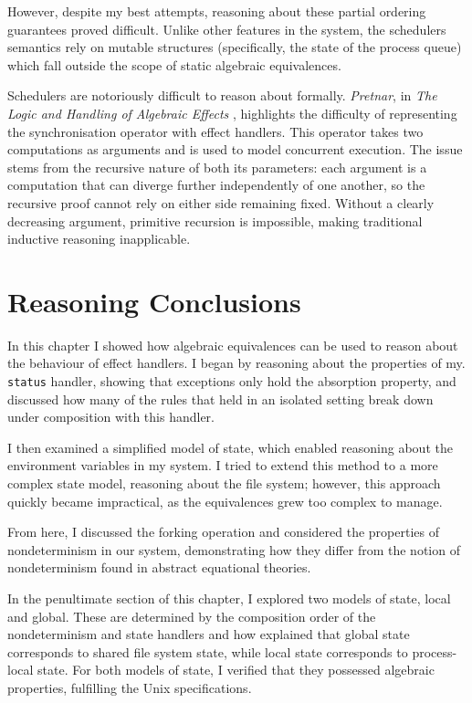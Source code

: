 \documentclass[logo,bsc,singlespacing,parskip]{infthesis}
\begin{document}
However, despite my best attempts, reasoning about these partial ordering guarantees proved difficult. Unlike other features in the system, the schedulers semantics rely on mutable structures (specifically, the state of the process queue) which fall outside the scope of static algebraic equivalences.

Schedulers are notoriously difficult to reason about formally. \textit{Pretnar}, in \textit{The Logic and Handling of Algebraic Effects} \cite{Pretnar:2010}, highlights the difficulty of representing the synchronisation operator with effect handlers. This operator takes two computations as arguments and is used to model concurrent execution. The issue stems from the recursive nature of both its parameters: each argument is a computation that can diverge further independently of one another, so the recursive proof cannot rely on either side remaining fixed. Without a clearly decreasing argument, primitive recursion is impossible, making traditional inductive reasoning inapplicable.

\section{Reasoning Conclusions}
\label{reasoning-conclusion}
In this chapter I showed how algebraic equivalences can be used to reason about the behaviour of effect handlers. I began by reasoning about the properties of my. \lstinline{status} handler, showing that exceptions only hold the absorption property, and discussed how many of the rules that held in an isolated setting break down under composition with this handler. 

I then examined a simplified model of state, which enabled reasoning about the environment variables in my system. I tried to extend this method to a more complex state model, reasoning about the file system; however, this approach quickly became impractical, as the equivalences grew too complex to manage.


From here, I discussed the forking operation and considered the properties of nondeterminism in our system, demonstrating how they differ from the notion of nondeterminism found in abstract equational theories.

In the penultimate section of this chapter, I explored two models of state, local and global. These are determined by the composition order of the {nondeterminism} and {state} handlers and how explained that global state corresponds to shared file system state, while local state corresponds to process-local state. For both models of state, I verified that they possessed algebraic properties, fulfilling the Unix specifications.
\end{document}
